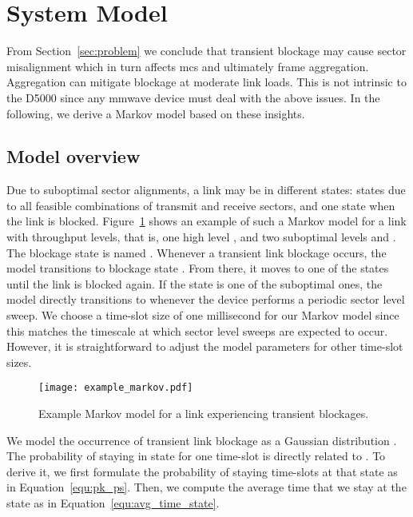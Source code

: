 \documentclass{article}
\begin{document}
\section{System Model}
\label{sec:approach}

From Section~\ref{sec:problem} we conclude that transient blockage may cause sector misalignment which in turn affects \ac{mcs} and ultimately frame aggregation. Aggregation can mitigate blockage at moderate link loads. This is not intrinsic to the D5000 since any \ac{mmwave} device must deal with the above issues. In the following, we derive a Markov model based on these insights.

\subsection{Model overview}
\label{sec:model_ovw}

Due to suboptimal sector alignments, a link may be in  different states:  states due to all feasible combinations of transmit and receive sectors, and one state when the link is blocked. Figure~\ref{fig:example_markov} shows an example of such a Markov model for a link with  throughput levels, that is, one high level , and two suboptimal levels  and . The blockage state is named . Whenever a transient link blockage occurs, the model transitions to blockage state . From there, it moves to one of the  states until the link is blocked again. If the state is one of the suboptimal ones, the model directly transitions to  whenever the device performs a periodic sector level sweep. We choose a time-slot size of one millisecond for our Markov model since this matches the timescale at which  sector level sweeps are expected to occur. However, it is straightforward to adjust the model parameters for other time-slot sizes.

\begin{figure}
	\centering
		\texttt{[image: example\_markov.pdf]}
	\caption{Example Markov model for a link experiencing transient blockages.}
	\label{fig:example_markov}
\end{figure}

We model the occurrence of transient link blockage as a Gaussian distribution . The probability  of staying in state  for one time-slot is directly related to . To derive it, we first formulate the probability  of staying  time-slots at that state as in Equation~\ref{equ:pk_ps}. Then, we compute the average time  that we stay at the state as in Equation~\ref{equ:avg_time_state}.
\end{document}
